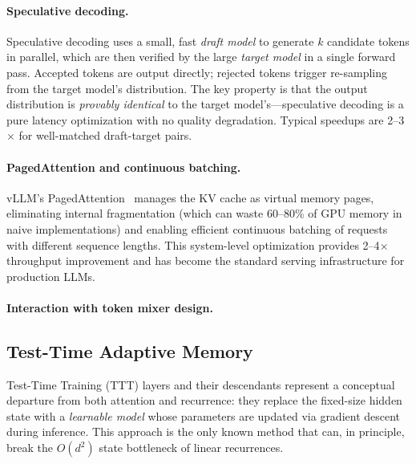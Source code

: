 \documentclass[11pt,a4paper]{article}
\begin{document}
\paragraph{Speculative decoding.}
Speculative decoding uses a small, fast \emph{draft model} to generate $k$ candidate tokens in parallel, which are then verified by the large \emph{target model} in a single forward pass. Accepted tokens are output directly; rejected tokens trigger re-sampling from the target model's distribution. The key property is that the output distribution is \emph{provably identical} to the target model's---speculative decoding is a pure latency optimization with no quality degradation. Typical speedups are 2--3$\times$ for well-matched draft-target pairs.

\paragraph{PagedAttention and continuous batching.}
vLLM's PagedAttention~\cite{kwon2023pagedattention} manages the KV cache as virtual memory pages, eliminating internal fragmentation (which can waste 60--80\% of GPU memory in naive implementations) and enabling efficient continuous batching of requests with different sequence lengths. This system-level optimization provides 2--4$\times$ throughput improvement and has become the standard serving infrastructure for production LLMs.

\paragraph{Interaction with token mixer design.}

\subsection{Test-Time Adaptive Memory}
\label{subsec:ttm}

Test-Time Training (TTT) layers and their descendants represent a conceptual departure from both attention and recurrence: they replace the fixed-size hidden state with a \emph{learnable model} whose parameters are updated via gradient descent during inference. This approach is the only known method that can, in principle, break the $O(d^2)$ state bottleneck of linear recurrences.
\end{document}
